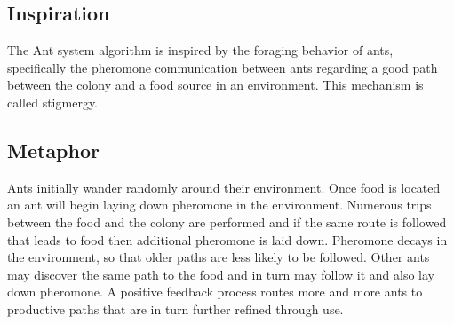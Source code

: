\subsection{Inspiration}
The Ant system algorithm is inspired by the foraging behavior of ants, specifically the pheromone communication between ants regarding a good path between the colony and a food source in an environment. This mechanism is called stigmergy.

\subsection{Metaphor}
Ants initially wander randomly around their environment. Once food is located an ant will begin laying down pheromone in the environment. Numerous trips between the food and the colony are performed and if the same route is followed that leads to food then additional pheromone is laid down. Pheromone decays in the environment, so that older paths are less likely to be followed. Other ants may discover the same path to the food and in turn may follow it and also lay down pheromone. A positive feedback process routes more and more ants to productive paths that are in turn further refined through use.

